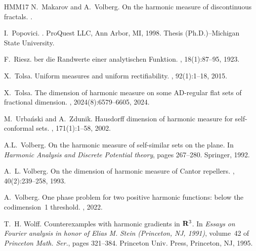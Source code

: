 \documentclass{article}
\newcounter{lem}
\theoremstyle{plain}
\theoremstyle{plain}
\theoremstyle{definition}
\theoremstyle{plain}
\begin{document}
\begin{thebibliography}{HMM{\etalchar{+}}17}
N.~Makarov and A.~Volberg.
\newblock On the harmonic measure of discontinuous fractals.
.

I.~Popovici.
.
\newblock ProQuest LLC, Ann Arbor, MI, 1998.
\newblock Thesis (Ph.D.)--Michigan State University.

F.~Riesz.
ber die Randwerte einer analytischen Funktion.
, 18(1):87--95, 1923.

X.~Tolsa.
\newblock Uniform measures and uniform rectifiability.
, 92(1):1--18, 2015.

X.~Tolsa.
\newblock The dimension of harmonic measure on some AD-regular flat sets of fractional dimension.
, 2024(8):6579--6605, 2024.

M.~Urba\'{n}ski and A.~Zdunik.
\newblock Hausdorff dimension of harmonic measure for self-conformal sets.
, 171(1):1--58, 2002.

A.L.~Volberg.
\newblock On the harmonic measure of self-similar sets on the plane.
\newblock In {\em Harmonic Analysis and Discrete Potential theory}, pages
  267--280. Springer, 1992.

A.~L. Volberg.
\newblock On the dimension of harmonic measure of {C}antor repellers.
, 40(2):239--258, 1993.

A.~Volberg.
\newblock One phase problem for two positive harmonic functions: below the codimension~1 threshold.
, 2022.

T.~H. Wolff.
\newblock Counterexamples with harmonic gradients in {${\bf R}^3$}.
\newblock In {\em Essays on {F}ourier analysis in honor of {E}lias {M}. {S}tein
  ({P}rinceton, {NJ}, 1991)}, volume~42 of {\em Princeton Math. Ser.}, pages
  321--384. Princeton Univ. Press, Princeton, NJ, 1995.

\end{thebibliography}
\end{document}
